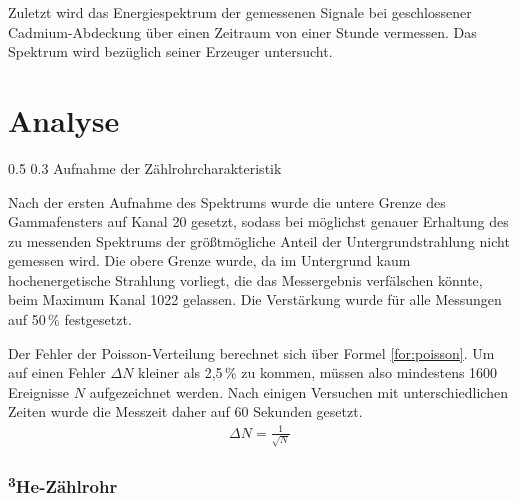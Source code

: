 \documentclass[german, %
parskip=full, %
bibliography=totoc, %
]{scrartcl}
\makeatletter
\renewcommand\subsection{\@startsection 
   {subsection}{2}{0mm}%
   {0.5\baselineskip}%
   {0.3\baselineskip}%
   {\bfseries\sffamily\large}%
   }
\makeatother
\begin{document}
Zuletzt wird das Energiespektrum der gemessenen Signale bei geschlossener Cadmium-Abdeckung über einen Zeitraum von einer Stunde vermessen. Das Spektrum wird bezüglich seiner Erzeuger untersucht. 

\section{Analyse}

\subsection{Aufnahme der Zählrohrcharakteristik}

Nach der ersten Aufnahme des Spektrums wurde die untere Grenze des Gammafensters auf Kanal 20 gesetzt, sodass bei möglichst genauer Erhaltung des zu messenden Spektrums der größtmögliche Anteil der Untergrundstrahlung nicht gemessen wird. Die obere Grenze wurde, da im Untergrund kaum hochenergetische Strahlung vorliegt, die das Messergebnis verfälschen könnte, beim Maximum Kanal 1022 gelassen. Die Verstärkung wurde für alle Messungen auf 50\,\% festgesetzt.

Der Fehler der Poisson-Verteilung berechnet sich über Formel \ref{for:poisson}. Um auf einen Fehler $\Delta N$ kleiner als 2,5\,\% zu kommen, müssen also mindestens 1600 Ereignisse $N$ aufgezeichnet werden. Nach einigen Versuchen mit unterschiedlichen Zeiten wurde die Messzeit daher auf 60 Sekunden gesetzt.
\begin{align}
\Delta N = \frac{1}{\sqrt{N}} \label{for:poisson}
\end{align}

\subsubsection{\textsuperscript{3}He-Zählrohr}
\end{document}
